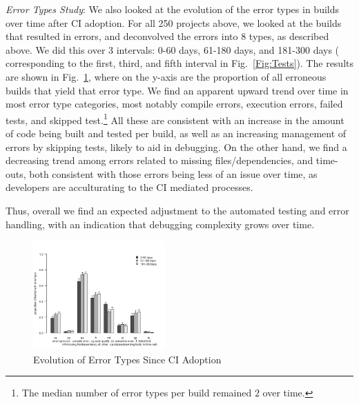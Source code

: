 \smallskip\noindent \emph{Error Types Study}:
We also looked at the evolution of the error types in builds over time after CI 
adoption.
For all 250 projects above, we looked at the builds that resulted in errors, 
and deconvolved the errors into 8 types, as described above.
We did this over 3 intervals: 0-60 days, 61-180 days, and 181-300 days (\ie 
corresponding to the first, third, and fifth interval in Fig.~\ref{Fig:Tests}).
The results are shown in Fig.~\ref{Fig:BugTypes}, where on the y-axis are 
the proportion of all erroneous builds that yield that error type.
We find an apparent upward trend over time in most error type categories, 
most notably compile errors, execution errors, failed tests, and skipped 
test.\footnote{The median number of error types per build remained $2$ over 
time.}
All these are consistent with an increase in the amount of code being built 
and tested per build, as well as an increasing management of errors by 
skipping tests, likely to aid in debugging.
On the other hand, we find a decreasing trend among errors related to missing 
files/dependencies, and time-outs, both consistent with those errors being less 
of an issue over time, as developers are acculturating to the CI mediated 
processes.

Thus, overall we find an expected adjustment to the automated testing and 
error handling, with an indication that debugging complexity grows over time.



\begin{figure}[!t]
	\centering
	\includegraphics[width=0.45\textwidth, clip=true, trim=0 15 15 50]{new_plot_together.png}
	\caption{Evolution of Error Types Since CI Adoption}
	\label{Fig:BugTypes}
\end{figure}

